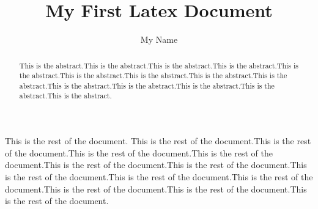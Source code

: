 \documentclass[10pt]{article}
\begin{document}
\title{My First Latex Document}
\author{My Name}
\date{}

\maketitle

\begin{abstract}
This is the abstract.This is the abstract.This is the abstract.This is the abstract.This is the abstract.This is the abstract.This is the abstract.This is the abstract.This is the abstract.This is the abstract.This is the abstract.This is the abstract.This is the abstract.This is the abstract.

\end{abstract}


This is the rest of the document. This is the rest of the document.This is the rest of the document.This is the rest of the document.This is the rest of the document.This is the rest of the document.This is the rest of the document.This is the rest of the document.This is the rest of the document.This is the rest of the document.This is the rest of the document.This is the rest of the document.This is the rest of the document.

% 
\end{document}
